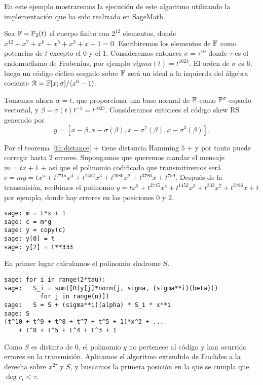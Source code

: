 \begin{exampleth}
En este ejemplo mostraremos la ejecución de este algoritmo utilizando la implementación que ha sido realizada en SageMath.

Sea \(\mathbb{F} = \mathbb{F}_2(t)\) el cuerpo finito con  \(2^{12}\) elementos, donde \(x^{12} + x^{7} + x^{6} + x^{5} + x^{3} + x + 1 = 0\). Escribiremos los elementos de \(\mathbb{F}\) como potencias de \(t\) excepto el \(0\) y el \(1\). Consideremos entonces \(\sigma = \tau^{10}\) donde  \(\tau\) es el endomorfismo de Frobenius, por ejemplo \(sigma(t) = t^{1024}\). El orden de \(\sigma\) es 6, luego un código cíclico sesgado sobre \(\mathbb{F}\) será un ideal a la izquierda del álgebra cociente  \( \mathcal{R} = \mathbb{F}[x;\sigma] / \langle x^{6} - 1\rangle\).

Tomemos ahora \(\alpha = t\), que proporciona una base normal de \(\mathbb{F}\) como \(\mathbb{F}^{\sigma}\)-espacio vectorial, y \(\beta = \sigma(t)t^{-1} = t^{1023}\). Consideramos entonces el código skew RS generado por
\[
    g = [x - \beta, x - \sigma(\beta), x - \sigma^{2}(\beta), x - \sigma^{3}(\beta)]
.\]

Por el teorema~\ref{th:distance} + tiene distancia Hamming \(5\) + y por tanto puede corregir hasta \(2\) errores. Supongamos que queremos mandar el mensaje \(m = tx +1\) + así que el polinomio codificado que transmitiremos será \(c = mg =  tx^{5} + t^{2715}x^{4} + t^{1452}x^{3} + t^{2080}x^{2} + t^{3786}x + t^{759} \). Después de la transmisión, recibimos el polinomio \(y = tx^{5} + t^{2715}x^{4} + t^{1452}x^{3} + t^{333}x^{2} + t^{3786}x + t\) por ejemplo, donde hay errores en las posiciones \(0\) y \(2\).

\begin{lstlisting}
sage: m = t*x + 1
sage: c = m*g
sage: y = copy(c)
sage: y[0] = t
sage: y[2] = t**333
\end{lstlisting}

En primer lugar calculamos el polinomio síndrome \(S\).
\begin{lstlisting}
sage: for i in range(2*tau):
sage:   S_i = sum([R(y[j]*norm(j, sigma, (sigma**i)(beta)))
          for j in range(n)])
sage:   S = S + (sigma**i)(alpha) * S_i * x**i
sage: S
(t^10 + t^9 + t^8 + t^7 + t^5 + 1)*x^3 + ...
    + t^8 + t^5 + t^4 + t^3 + 1
\end{lstlisting}

Como \(S\) es distinto de \(0\), el polinomio \(y\) no pertenece al código y han ocurrido errores en la transmisión. Aplicamos el algoritmo extendido de Euclides a la derecha sobre \(x^{2\tau}\) y \(S\), y buscamos la primera posición en la que se cumpla que \(\deg r_i < \tau\).


\end{exampleth}
